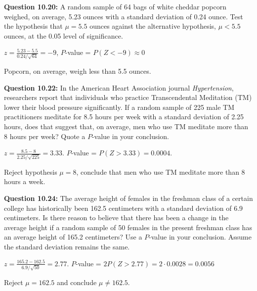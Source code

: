 \documentclass{article}
\begin{document}
\textbf{Question 10.20:}
A random sample of 64 bags of white cheddar 
popcorn weighed, on average, 5.23 ounces with a
standard deviation of 0.24 ounce. Test the hypothesis
that $\mu = 5.5$ ounces against the alternative hypothesis,
$\mu < 5.5$ ounces, at the 0.05 level of significance.
\begin{description}
    \item $z = \frac{5.23-5.5}{0.24/\sqrt{64}}=-9$, $P$-value = $P(Z<-9)\approx 0$
    \item Popcorn, on average, weigh less than 5.5 ounces.
\end{description}

\textbf{Question 10.22:}
In the American Heart Association journal 
\textit{Hypertension}, researchers report that individuals who
practice Transcendental Meditation (TM) lower their
blood pressure significantly. If a random sample of 225
male TM practitioners meditate for 8.5 hours per week
with a standard deviation of 2.25 hours, does that suggest 
that, on average, men who use TM meditate more
than 8 hours per week? Quote a $P$-value in your 
conclusion.
\begin{description}
    \item $z = \frac{8.5-8}{2.25/\sqrt{225}}=3.33$. $P$-value = $P(Z>3.33)=0.0004$.
    \item Reject hypothesis $\mu=8$, conclude that men who use TM meditate more than 
    8 hours a week.
\end{description}

\textbf{Question 10.24:}
The average height of females in the freshman
class of a certain college has historically been 162.5 
centimeters with a standard deviation of 6.9 centimeters.
Is there reason to believe that there has been a change
in the average height if a random sample of 50 females
in the present freshman class has an average height of
165.2 centimeters? Use a $P$-value in your conclusion.
Assume the standard deviation remains the same.
\begin{description}
    \item $z=\frac{165.2-162.5}{6.9/\sqrt{50}}=2.77$. $P$-value = $2P(Z>2.77)=2\cdot 0.0028 = 0.0056$
    \item Reject $\mu=162.5$ and conclude $\mu\not= 162.5$.
\end{description}
\end{document}
